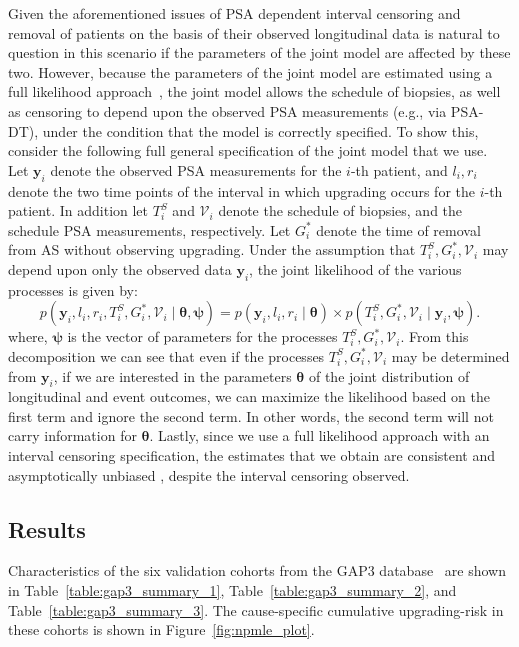 Given the aforementioned issues of PSA dependent interval censoring and removal of patients on the basis of their observed longitudinal data is natural to question in this scenario if the parameters of the joint model are affected by these two. However, because the parameters of the joint model are estimated using a full likelihood approach~\citep{tsiatis2004joint}, the joint model allows the schedule of biopsies, as well as censoring to depend upon the observed PSA measurements (e.g., via PSA-DT), under the condition that the model is correctly specified. To show this, consider the following full general specification of the joint model that we use. Let $\boldsymbol{y}_i$ denote the observed PSA measurements for the $i$-th patient, and $l_i, r_i$ denote the two time points of the interval in which upgrading occurs for the $i$-th patient. In addition let $T_i^S$ and $\mathcal{V}_i$ denote the schedule of biopsies, and the schedule PSA measurements, respectively. Let $G^*_i$ denote the time of removal from AS without observing upgrading. Under the assumption that $T_i^S, G^*_i, \mathcal{V}_i$ may depend upon only the observed data $\boldsymbol{y}_i$, the joint likelihood of the various processes is given by:
\begin{equation*}
p(\boldsymbol{y}_i, l_i, r_i, T_i^S, G^*_i, \mathcal{V}_i \mid \boldsymbol{\theta}, \boldsymbol{\psi}) = p(\boldsymbol{y}_i, l_i, r_i \mid \boldsymbol{\theta}) \times p(T_i^S, G^*_i, \mathcal{V}_i \mid \boldsymbol{y}_i, \boldsymbol{\psi}).
\end{equation*}
where, $\boldsymbol{\psi}$ is the vector of parameters for the processes $T_i^S, G^*_i, \mathcal{V}_i$. From this decomposition we can see that even if the processes $T_i^S, G^*_i, \mathcal{V}_i$ may be determined from $\boldsymbol{y}_i$, if we are interested in the parameters $\boldsymbol{\theta}$ of the joint distribution of longitudinal and event outcomes, we can maximize the likelihood based on the first term and ignore the second term. In other words, the second term will not carry information for $\boldsymbol{\theta}$. Lastly, since we use a full likelihood approach with an interval censoring specification, the estimates that we obtain are consistent and asymptotically unbiased \citep{gentleman1994maximum}, despite the interval censoring observed. 

\clearpage
\subsection{Results}
Characteristics of the six validation cohorts from the GAP3 database~\citep{gap3_2018} are shown in Table~\ref{table:gap3_summary_1}, Table~\ref{table:gap3_summary_2}, and Table~\ref{table:gap3_summary_3}. The cause-specific cumulative upgrading-risk in these cohorts is shown in Figure~\ref{fig:npmle_plot}.

